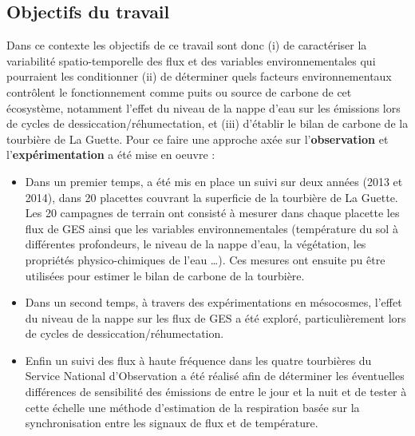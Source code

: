 \subsection*{Objectifs du travail}

Dans ce contexte les objectifs de ce travail sont donc (i) de caractériser la variabilité spatio-temporelle des flux et des variables environnementales qui pourraient les conditionner (ii) de déterminer quels facteurs environnementaux contrôlent le fonctionnement comme puits ou source de carbone de cet écosystème, notamment l'effet du niveau de la nappe d'eau sur les émissions lors de cycles de dessiccation/réhumectation, et (iii) d'établir le bilan de carbone de la tourbière de La Guette.
Pour ce faire une approche axée sur l'\textbf{observation} et l'\textbf{expérimentation} a été mise en oeuvre : 

\begin{itemize}

\item Dans un premier temps, a été mis en place un suivi sur deux années (2013 et 2014), dans 20 placettes couvrant la superficie de la tourbière de La Guette. 
Les 20 campagnes de terrain ont consisté à mesurer dans chaque placette les flux de GES ainsi que les variables environnementales (température du sol à différentes profondeurs, le niveau de la nappe d'eau, la végétation, les propriétés physico-chimiques de l'eau \dots).
Ces mesures ont ensuite pu être utilisées pour estimer le bilan de carbone de la tourbière.
\item Dans un second temps, à travers des expérimentations en mésocosmes, l'effet du niveau de la nappe sur les flux de GES a été exploré, particulièrement lors de cycles de dessiccation/réhumectation.
\item Enfin un suivi des flux à haute fréquence dans les quatre tourbières du Service National d'Observation a été réalisé afin de déterminer les éventuelles différences de sensibilité des émissions de \coo entre le jour et la nuit et de tester à cette échelle une méthode d'estimation de la respiration basée sur la synchronisation entre les signaux de flux et de température.
\end{itemize}

